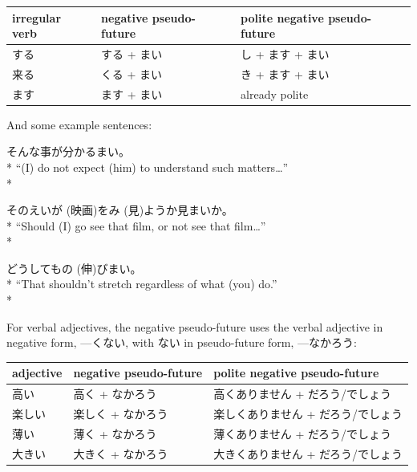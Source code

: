 \documentclass[11pt, b5paper, twoside, openright, onecolumn]{book}
\makeatletter
\newcommand*{\rubystack}[2]{{\relscale{0.5}%
  \begin{tabular}[b]{@{}c@{}}%
    {#1}\\%
   {\textscale{2}{#2}}%
  \end{tabular}}%
}
\DeclareRobustCommand*{\ruby}[2]{%
  \mbox{%
    \setlength{\parskip}{0ex}%
    \BeginAccSupp{method=pdfstringdef,ActualText={#1}}%
      \rubystack{\phantom{#2}}{#1}%
      \llap{%
        \rubystack{#2}{\phantom{#1}}%
      }%
    \EndAccSupp{}%
  }%
}
\renewcommand*{\ruby}[2]{#2 (#1)}%
\newenvironment{exampleblock}{
\setlength{\parindent}{0.6in}
\begin{minipage}[t]{\dimexpr\textwidth-\parindent}}
{\end{minipage}}
\newenvironment{mytabular}[1]{\noindent\hspace{0.4in}
\begin{tabular}[h]{#1}}{\end{tabular}}
\newenvironment{mytabularcentered}[1]{\noindent
\begin{center}\begin{tabular}[h]{#1}}{\end{tabular}\end{center}}
\makeatother
\begin{document}
\smaller
\begin{mytabular}{| l  l  l |}\hline 
\rule{0pt}{2.4ex}irregular verb & negative pseudo-future & polite negative pseudo-future\\ 
\hline
\rule{0pt}{2.4ex}する & する + まい & し + ます + まい\\ 
\rule{0pt}{2.4ex}来る & くる + まい & き + ます + まい\\ 
\rule{0pt}{2.4ex}ます & ます + まい & already polite\\ 
\hline 
\end{mytabular}
\larger
\vspace{0.5cm}


And some example sentences:

\vspace{0.4cm}
\begin{exampleblock}
そんな事が分かるまい。 \\* 
“(I) do not expect (him) to understand such matters…” \\* 
\end{exampleblock}
\vspace{0.2cm}

\begin{exampleblock}
その\ruby{映画}{えいが}を\ruby{見}{み}ようか見まいか。 \\* 
“Should (I) go see that film‚ or not see that film…” \\* 
\end{exampleblock}
\vspace{0.2cm}

\begin{exampleblock}
どうしても\ruby{伸}{の}びまい。 \\* 
“That shouldn’t stretch regardless of what (you) do.” \\* 
\end{exampleblock}
\vspace{0.2cm}

For verbal adjectives‚ the negative pseudo-future uses the verbal adjective in negative form‚ —くない‚ with ない in pseudo-future form‚ —なかろう:

\vspace{0.5cm}
\smaller
\begin{center}
\begin{mytabularcentered}{| l  l  l |}\hline 
\rule{0pt}{2.4ex}adjective & negative pseudo-future & polite negative pseudo-future\\ 
\hline
\rule{0pt}{2.4ex}高い & 高く + なかろう & 高くありません + だろう/でしょう\\ 
\rule{0pt}{2.4ex}楽しい & 楽しく + なかろう & 楽しくありません + だろう/でしょう\\ 
\rule{0pt}{2.4ex}薄い & 薄く + なかろう & 薄くありません + だろう/でしょう\\ 
\rule{0pt}{2.4ex}大きい & 大きく + なかろう & 大きくありません + だろう/でしょう\\ 
\hline 
\end{mytabularcentered}
\end{center}
\larger
\vspace{0.5cm}
\end{document}
